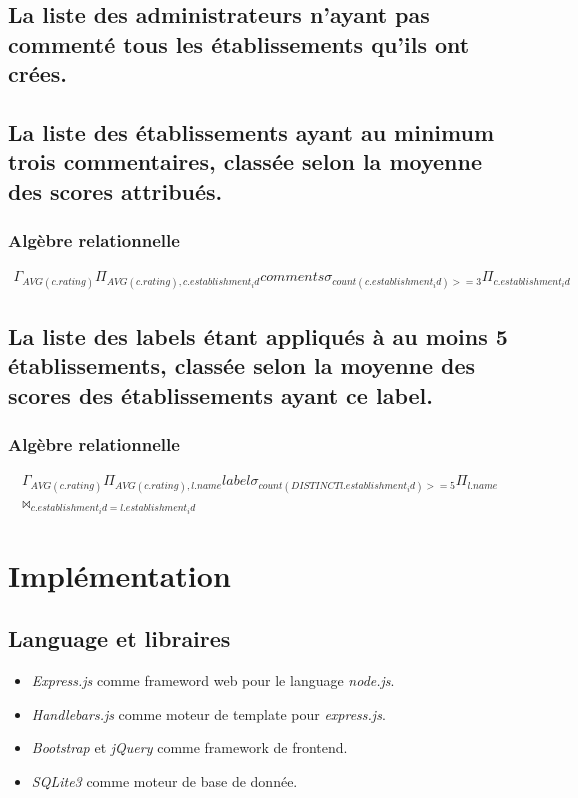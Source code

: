\documentclass[a4paper,10pt]{article}
\begin{document}
\subsection{La liste des administrateurs n'ayant pas commenté tous les
établissements qu'ils ont crées.}
    

\subsection{La liste des établissements ayant au minimum trois commentaires,
classée selon la moyenne des scores attribués.}
    

\subsubsection{Algèbre relationnelle}
    \begin{align}
        \Gamma_{AVG(c.rating)}\Pi_{AVG(c.rating), c.establishment_id}comments \sigma_{count(c.establishment_id)>=3}\Pi_{c.establishment_id}
    \end{align}

\subsection{La liste des labels étant appliqués à au moins 5 établissements,
classée selon la moyenne des scores des établissements ayant ce label.}
    

\subsubsection{Algèbre relationnelle}
    \begin{align}
        \Gamma_{AVG(c.rating)}\Pi_{AVG(c.rating), l.name}label \sigma_{count(DISTINCT l.establishment_id)>=5}\Pi_{l.name}
        \\\bowtie_{c.establishment_id=l.establishment_id}
    \end{align}



\section{Implémentation}
\subsection{Language et libraires}
\begin{itemize}
    \item \emph{Express.js} comme frameword web pour le language \emph{node.js}.
    \item \emph{Handlebars.js} comme moteur de template pour \emph{express.js}.
    \item \emph{Bootstrap} et \emph{jQuery} comme framework de frontend.
    \item \emph{SQLite3} comme moteur de base de donnée.
\end{itemize}
\end{document}
